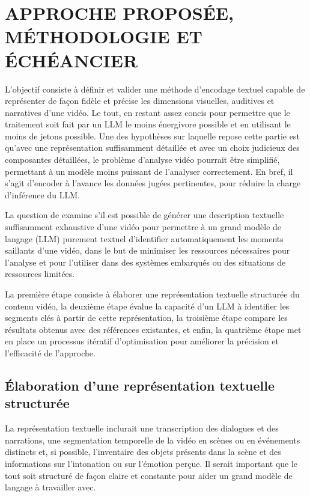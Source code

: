 \chapter{APPROCHE PROPOSÉE, MÉTHODOLOGIE ET ÉCHÉANCIER}

L'objectif consiste à définir et valider une méthode d'encodage textuel capable de représenter de façon fidèle et précise les dimensions visuelles, auditives et narratives d'une vidéo. Le tout, en restant assez concis pour permettre que le traitement soit fait par un LLM le moins énergivore possible et en utilisant le moins de jetons possible. Une des hypothèses sur laquelle repose cette partie est qu'avec une représentation suffisamment détaillée et avec un choix judicieux des composantes détaillées, le problème d'analyse vidéo pourrait être simplifié, permettant à un modèle moins puissant de l'analyser correctement. En bref, il s’agit d’encoder à l’avance les données jugées pertinentes, pour réduire la charge d’inférence du LLM.

La question de examine s'il est possible de générer une description textuelle suffisamment exhaustive d'une vidéo pour permettre à un grand modèle de langage (LLM) purement textuel d'identifier automatiquement les moments saillants d'une vidéo, dans le but de minimiser les ressources nécessaires pour l'analyse et pour l'utiliser dans des systèmes embarqués ou des situations de ressources limitées.

La première étape consiste à élaborer une représentation textuelle structurée du contenu vidéo, la deuxième étape évalue la capacité d'un LLM à identifier les segments clés à partir de cette représentation, la troisième étape compare les résultats obtenus avec des références existantes, et enfin, la quatrième étape met en place un processus itératif d'optimisation pour améliorer la précision et l'efficacité de l'approche.

\section{Élaboration d'une représentation textuelle structurée}

La représentation textuelle inclurait une transcription des dialogues et des narrations, une segmentation temporelle de la vidéo en scènes ou en événements distincts et, si possible, l'inventaire des objets présents dans la scène et des informations sur l'intonation ou sur l'émotion perçue. Il serait important que le tout soit structuré de façon claire et constante pour aider un grand modèle de langage à travailler avec.

